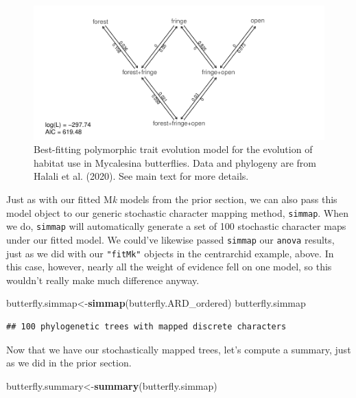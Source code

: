 \documentclass[fleqn,10pt,lineno]{wlpeerj} %
\newenvironment{Shaded}{\begin{snugshade}}{\end{snugshade}}
\newcommand{\FunctionTok}[1]{\textcolor[rgb]{0.13,0.29,0.53}{\textbf{#1}}}
\newcommand{\NormalTok}[1]{#1}
\newcommand{\OtherTok}[1]{\textcolor[rgb]{0.56,0.35,0.01}{#1}}
\begin{document}
\begin{figure}
\includegraphics[width=1\linewidth]{Revell.phytools-v2_peerj_files/figure-latex/ordered-ard-fitpolyMk-1} \caption{Best-fitting polymorphic trait evolution model for the evolution of habitat use in Mycalesina butterflies. Data and phylogeny are from Halali et al. (2020). See main text for more details.}\label{fig:ordered-ard-fitpolyMk}
\end{figure}

Just as with our fitted M\emph{k} models from the prior section, we can also pass this model object to our generic stochastic character mapping method, \texttt{simmap}. When we do, \texttt{simmap} will automatically generate a set of 100 stochastic character maps under our fitted model. We could've likewise passed \texttt{simmap} our \texttt{anova} results, just as we did with our \texttt{"fitMk"} objects in the centrarchid example, above. In this case, however, nearly all the weight of evidence fell on one model, so this wouldn't really make much difference anyway.

\begin{Shaded}
\begin{Highlighting}[]
\NormalTok{butterfly.simmap}\OtherTok{\textless{}{-}}\FunctionTok{simmap}\NormalTok{(butterfly.ARD\_ordered)}
\NormalTok{butterfly.simmap}
\end{Highlighting}
\end{Shaded}

\begin{verbatim}
## 100 phylogenetic trees with mapped discrete characters
\end{verbatim}

Now that we have our stochastically mapped trees, let's compute a summary, just as we did in the prior section.

\begin{Shaded}
\begin{Highlighting}[]
\NormalTok{butterfly.summary}\OtherTok{\textless{}{-}}\FunctionTok{summary}\NormalTok{(butterfly.simmap)}
\end{Highlighting}
\end{Shaded}
\end{document}
